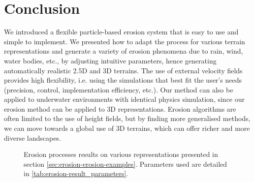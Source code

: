 \section{Conclusion}
\label{sec:erosion-conclusion}
We introduced a flexible particle-based erosion system that is easy to use and simple to implement. We presented how to adapt the process for various terrain representations and generate a variety of erosion phenomena due to rain, wind, water bodies, etc., by adjusting intuitive parameters, hence generating automatically realistic 2.5D and 3D terrains. The use of external velocity fields provides high flexibility, i.e. using the simulations that best fit the user's needs (precision, control, implementation efficiency, etc.).  
Our method can also be applied to underwater environments with identical physics simulation, since our erosion method can be applied to 3D representations.  
Erosion algorithms are often limited to the use of height fields, but by finding more generalised methods, we can move towards a global use of 3D terrains, which can offer richer and more diverse landscapes.

\clearpage
\begin{figure*}
	\centering
	\caption{Erosion processes results on various representations presented in section \cref{sec:erosion-erosion-examples}. Parameters used are detailed in \cref{tab:erosion-result_parameters}.}
	\label{tab:erosion-result_figures}
\end{figure*}

